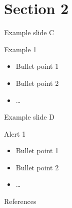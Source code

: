 \documentclass[18pt]{beamer}
\begin{document}
\section{Section 2}
\begin{frame}{Example slide C}
\begin{exampleblock}{Example 1}
\begin{itemize}
\item Bullet point 1
\pause
\item Bullet point 2
\item \dots
\end{itemize}
\end{exampleblock}
\end{frame}

\begin{frame}{Example slide D}
\begin{alertblock}{Alert 1}
\begin{itemize}
\item Bullet point 1
\pause
\item Bullet point 2
\item \dots
\end{itemize}
\end{alertblock}
\end{frame}

\appendix
\beginbackup

\begin{frame}[allowframebreaks]{References}
\printbibliography
\end{frame}

\backupend
\end{document}
